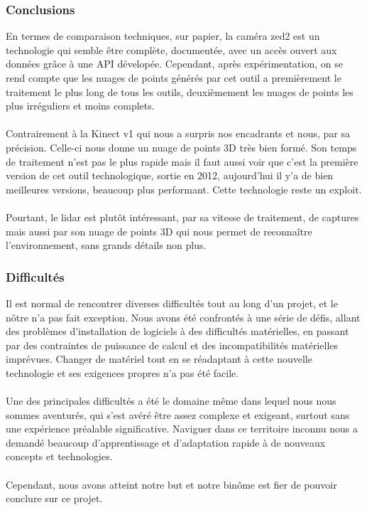     \subsubsection{Conclusions}
        \normalsize{
            En termes de comparaison techniques, sur papier, la caméra zed2 est un technologie qui semble être complète, documentée, avec un accès ouvert aux données grâce à une API dévelopée. Cependant, après expérimentation, on se rend compte que les nuages de points générés par cet outil a premièrement le traitement le plus long de tous les outils, deuxièmement les nuages de points les plus irréguliers et moins complets.
        }
        \\ \\
        \normalsize{
            Contrairement à la Kinect v1 qui nous a surpris nos encadrants et nous, par sa précision. Celle-ci nous donne un nuage de points 3D très bien formé. Son temps de traitement n'est pas le plus rapide mais il faut aussi voir que c'est la première version de cet outil technologique, sortie en 2012, aujourd'hui il y'a de bien meilleures versions, beaucoup plus performant. Cette technologie reste un exploit.
        }
        \\ \\
        \normalsize{
            Pourtant, le lidar est plutôt intéressant, par sa vitesse de traitement, de captures mais aussi par son nuage de points 3D qui nous permet de reconnaître l'environnement, sans grands détails non plus.
        }
        
    
    \subsubsection{Difficultés}

        \normalsize{
            Il est normal de rencontrer diverses difficultés tout au long d'un projet, et le nôtre n'a pas fait exception. Nous avons été confrontés à une série de défis, allant des problèmes d'installation de logiciels à des difficultés matérielles, en passant par des contraintes de puissance de calcul et des incompatibilités matérielles imprévues. Changer de matériel tout en se réadaptant à cette nouvelle technologie et ses exigences propres n'a pas été facile.
        }
        \\ \\
        \normalsize{
            Une des principales difficultés a été le domaine même dans lequel nous nous sommes aventurés, qui s'est avéré être assez complexe et exigeant, surtout sans une expérience préalable significative. Naviguer dans ce territoire inconnu nous a demandé beaucoup d'apprentissage et d'adaptation rapide à de nouveaux concepts et technologies.
        }
        \\ \\
        \normalsize{
            Cependant, nous avons atteint notre but et notre binôme est fier de pouvoir conclure sur ce projet.
        }
\clearpage